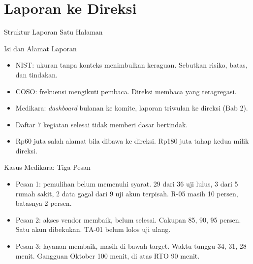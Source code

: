 \documentclass[aspectratio=169, table, 12pt]{beamer}
\begin{document}
\section{Laporan ke Direksi}

\begin{frame}{{\Large Struktur Laporan Satu Halaman}}
  \vspace{-2pt}
  \begin{center}
    \resizebox{!}{0.72\textheight}{}
  \end{center}
\end{frame}

\begin{frame}{{\Large Isi dan Alamat Laporan}}
  \vspace{6pt}
  \small
  \begin{itemize}
    \item NIST: ukuran tanpa konteks menimbulkan keraguan. Sebutkan risiko, batas, dan tindakan.
    \item COSO: frekuensi mengikuti pembaca. Direksi membaca yang teragregasi.
    \item Medikara: \textit{dashboard} bulanan ke komite, laporan triwulan ke direksi (Bab 2).
    \item Daftar 7 kegiatan selesai tidak memberi dasar bertindak.
    \item Rp60 juta salah alamat bila dibawa ke direksi. Rp180 juta tahap kedua milik direksi.
  \end{itemize}
\end{frame}

\begin{frame}{{\Large Kasus Medikara: Tiga Pesan}}
  \vspace{6pt}
  \small
  \begin{itemize}
    \item Pesan 1: pemulihan belum memenuhi syarat. 29 dari 36 uji lulus, 3 dari 5 rumah sakit, 2
          data gagal dari 9 uji akun terpisah. R-05 masih 10 persen, batasnya 2 persen.
    \item Pesan 2: akses vendor membaik, belum selesai. Cakupan 85, 90, 95 persen. Satu akun
          dibekukan. TA-01 belum lolos uji ulang.
    \item Pesan 3: layanan membaik, masih di bawah target. Waktu tunggu 34, 31, 28 menit. Gangguan
          Oktober 100 menit, di atas RTO 90 menit.
  \end{itemize}
\end{frame}
\end{document}
